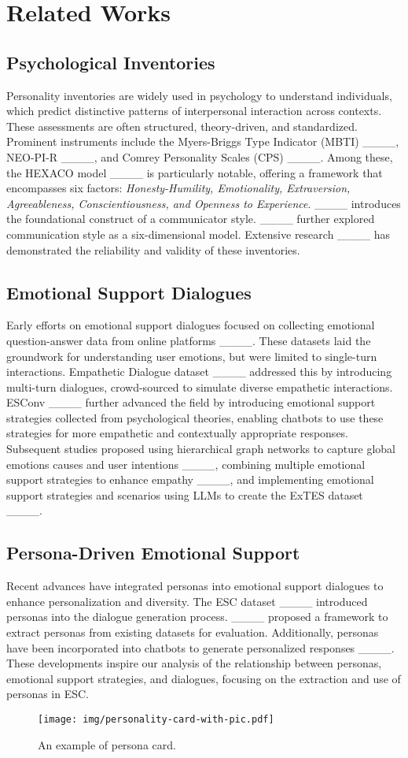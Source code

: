 \section{Related Works}
\subsection{Psychological Inventories}
Personality inventories are widely used in psychology to understand individuals, which predict distinctive patterns of interpersonal interaction across contexts.
These assessments are often structured, theory-driven, and standardized.
Prominent instruments include the Myers-Briggs Type Indicator (MBTI) ____, NEO-PI-R ____, and Comrey Personality Scales (CPS) ____. Among these, the HEXACO model ____ is particularly notable, offering a framework that encompasses six factors: \textit{Honesty-Humility, Emotionality, Extraversion, Agreeableness, Conscientiousness, and Openness to Experience}.
____ introduces the foundational construct of a communicator style. ____ further explored communication style as a six-dimensional model.
Extensive research ____ has demonstrated the reliability and validity of these inventories.

\subsection{Emotional Support Dialogues}
Early efforts on emotional support dialogues focused on collecting emotional question-answer data from online platforms ____. These datasets laid the groundwork for understanding user emotions, but were limited to single-turn interactions.
Empathetic Dialogue dataset ____ addressed this by introducing multi-turn dialogues, crowd-sourced to simulate diverse empathetic interactions.
ESConv ____ further advanced the field by introducing emotional support strategies collected from psychological theories, enabling chatbots to use these strategies for more empathetic and contextually appropriate responses.
Subsequent studies proposed using hierarchical graph networks to capture global emotions causes and user intentions ____, combining multiple emotional support strategies to enhance empathy ____, and implementing emotional support strategies and scenarios using LLMs to create the ExTES dataset ____.


\subsection{Persona-Driven Emotional Support}
Recent advances have integrated personas into emotional support dialogues to enhance personalization and diversity. The ESC dataset ____ introduced personas into the dialogue generation process. ____ proposed a framework to extract personas from existing datasets for evaluation. Additionally, personas have been incorporated into chatbots to generate personalized responses ____.
These developments inspire our analysis of the relationship between personas, emotional support strategies, and dialogues, focusing on the extraction and use of personas in ESC.


\begin{figure}
\setlength{\abovecaptionskip}{5pt}   
\setlength{\belowcaptionskip}{0pt}
    \centering
    \texttt{[image: img/personality-card-with-pic.pdf]}
    \caption{An example of persona card.}
    \label{fig:card-img}
    \vspace{-0.3cm}
\end{figure}